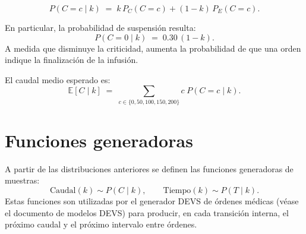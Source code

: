 \documentclass{article}
\begin{document}
\[
  P(C=c \mid k) \;=\; k\,P_C(C=c) + (1-k)\,P_E(C=c).
\]

En particular, la probabilidad de suspensión resulta:
\[
  P(C=0 \mid k) \;=\; 0.30\,(1-k).
\]
A medida que disminuye la criticidad, aumenta la probabilidad de que una
orden indique la finalización de la infusión.

El caudal medio esperado es:
\[
  \mathbb{E}[C \mid k]
  \;=\; \sum_{c \in \{0,50,100,150,200\}} c\;P(C=c \mid k).
\]

\section{Funciones generadoras}

A partir de las distribuciones anteriores se definen las funciones
generadoras de muestras:
\[
  \mathrm{Caudal}(k) \sim P(C \mid k),
  \qquad
  \mathrm{Tiempo}(k)  \sim P(T \mid k).
\]
Estas funciones son utilizadas por el generador DEVS de órdenes médicas
(véase el documento de modelos DEVS) para producir, en cada transición
interna, el próximo caudal y el próximo intervalo entre órdenes.
\end{document}
